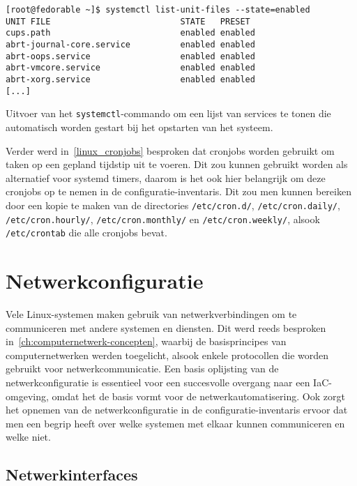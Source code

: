 \begin{listing}
  \begin{verbatim}
[root@fedorable ~]$ systemctl list-unit-files --state=enabled
UNIT FILE                          STATE   PRESET
cups.path                          enabled enabled
abrt-journal-core.service          enabled enabled
abrt-oops.service                  enabled enabled
abrt-vmcore.service                enabled enabled
abrt-xorg.service                  enabled enabled
[...]
  \end{verbatim}
  \caption[Lijst van automatisch gestarte services.]{Uitvoer van het \texttt{systemctl}-commando om een lijst van services te tonen die automatisch worden gestart bij het opstarten van het systeem.}
  \label{lst:systemd_list_unit_files}
\end{listing}

Verder werd in~\ref{linux_cronjobs} besproken dat cronjobs worden gebruikt om taken op een gepland tijdstip uit te voeren.
Dit zou kunnen gebruikt worden als alternatief voor systemd timers, daarom is het ook hier belangrijk om deze cronjobs op te nemen in de configuratie-inventaris.
Dit zou men kunnen bereiken door een kopie te maken van de directories \texttt{/etc/cron.d/}, \texttt{/etc/cron.daily/}, \texttt{/etc/cron.hourly/}, \texttt{/etc/cron.monthly/} en \texttt{/etc/cron.weekly/}, alsook \texttt{/etc/crontab} die alle cronjobs bevat.

\section{Netwerkconfiguratie}
\label{risico_netwerkconfiguratie}

Vele Linux-systemen maken gebruik van netwerkverbindingen om te communiceren met andere systemen en diensten.
Dit werd reeds besproken in~\ref{ch:computernetwerk-concepten}, waarbij de basisprincipes van computernetwerken werden toegelicht, alsook enkele protocollen die worden gebruikt voor netwerkcommunicatie.
Een basis oplijsting van de netwerkconfiguratie is essentieel voor een succesvolle overgang naar een IaC-omgeving, omdat het de basis vormt voor de netwerkautomatisering.
Ook zorgt het opnemen van de netwerkconfiguratie in de configuratie-inventaris ervoor dat men een begrip heeft over welke systemen met elkaar kunnen communiceren en welke niet.

\subsection{Netwerkinterfaces}
\label{risico_netwerkinterfaces}

